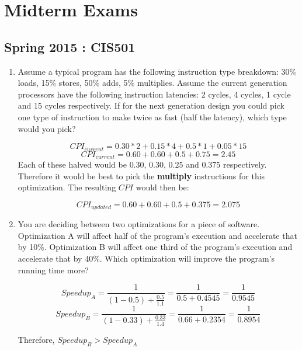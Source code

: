 \documentclass[12pt]{article}
\newenvironment{QandA}{\begin{enumerate}[label=\bfseries\arabic*.]\bfseries}
                      {\end{enumerate}}
\newenvironment{answered}{\par\quad\normalfont}{}
\begin{document}
\clearpage

\section{Midterm Exams}

\subsection{Spring 2015 : CIS501}

\begin{QandA}
   \item Assume a typical program has the following instruction type breakdown: 30\% loads, 15\% stores, 50\% adds, 5\% multiplies. Assume the current generation processors have the following instruction latencies: 2 cycles, 4 cycles, 1 cycle and 15 cycles respectively. If for the next generation design you could pick one type of instruction to make twice as fast (half the latency), which type would you pick?
        \begin{answered}
        \begin{equation*}
            CPI_{current} = 0.30 * 2 + 0.15 * 4 + 0.5 * 1 + 0.05 * 15
        \end{equation*}
        \begin{equation*}
            CPI_{current} = 0.60 + 0.60 + 0.5 + 0.75 = 2.45
        \end{equation*}
        Each of these halved would be $0.30$, $0.30$, $0.25$ and $0.375$ respectively. Therefore it would be best to pick the \textbf{multiply} instructions for this optimization. The resulting $CPI$ would then be:
        
        \begin{equation*}
            CPI_{updated} = 0.60 + 0.60 + 0.5 + 0.375 = 2.075
        \end{equation*}
        \end{answered}
        
    \item You are deciding between two optimizations for a piece of software. Optimization A will affect half of the program's execution and accelerate that by 10\%. Optimization B will affect one third of the program's execution and accelerate that by 40\%. Which optimization will improve the program's running time more?
    
    \begin{equation*}
        Speedup_{A} = \frac{1}{(1-0.5) + \frac{0.5}{1.1}} = \frac{1}{0.5 + 0.4545} = \frac{1}{0.9545}
    \end{equation*}
    \begin{equation*}
        Speedup_{B} = \frac{1}{(1-0.33) + \frac{0.33}{1.4}} = \frac{1}{0.66 + 0.2354} = \frac{1}{0.8954}
    \end{equation*}    
    
    Therefore, $Speedup_{B} > Speedup_{A}$
\end{QandA}
\end{document}
